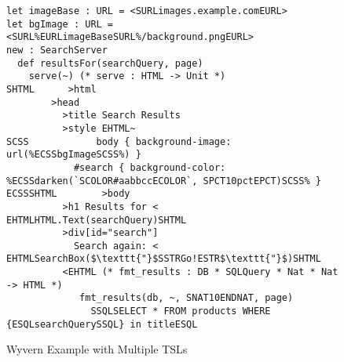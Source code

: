 \begin{figure}[t]
\begin{lstlisting}
let imageBase : URL = <SURLimages.example.comEURL>
let bgImage : URL = <SURL%EURLimageBaseSURL%/background.pngEURL>
new : SearchServer
  def resultsFor(searchQuery, page)
    serve(~) (* serve : HTML -> Unit *)
SHTML      >html
        >head
          >title Search Results
          >style EHTML~
SCSS            body { background-image: url(%ECSSbgImageSCSS%) }
            #search { background-color: %ECSSdarken(`SCOLOR#aabbccECOLOR`, SPCT10pctEPCT)SCSS% }
ECSSSHTML        >body
          >h1 Results for < EHTMLHTML.Text(searchQuery)SHTML
          >div[id="search"]
            Search again: < EHTMLSearchBox($\texttt{"}$SSTRGo!ESTR$\texttt{"}$)SHTML
          <EHTML (* fmt_results : DB * SQLQuery * Nat * Nat -> HTML *)
             fmt_results(db, ~, SNAT10ENDNAT, page)
               SSQLSELECT * FROM products WHERE {ESQLsearchQuerySSQL} in titleESQL
\end{lstlisting}
\caption{Wyvern Example with Multiple TSLs}
\label{f-example}
\end{figure}
%
%

